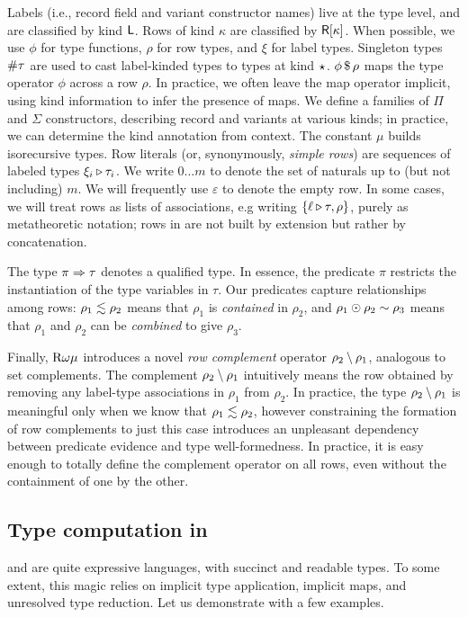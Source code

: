 \documentclass[sigplan,10pt,anonymous,review]{acmart}\settopmatter{printfolios=true,printccs=false,printacmref=false}
\begin{document}
Labels (i.e., record field and variant constructor names) live at the type level, and are classified by kind $\mathsf{L}$. Rows of kind $\kappa$ are classified by $\mathsf{R}[{\kappa}]$. When possible, we use $\phi$ for type functions, $\rho$ for row types, and $\xi$ for label types. Singleton types $\# \tau$ are used to cast label-kinded types to types at kind $\star_{}$.  ${\phi} \, \mathdollar \, \rho$ maps the type operator $\phi$ across a row $\rho$. In practice, we often leave the map operator implicit, using kind information to infer the presence of maps. We define a families of  $\Pi$ and $\Sigma$ constructors, describing record and variants at various kinds; in practice, we can determine the kind annotation from context. The constant $\mu$ builds isorecursive types. Row literals (or, synonymously, \emph{simple rows}) are sequences of labeled types $\xi_i \triangleright \tau_i$. We write $0 \dots m$ to denote the set of naturals up to (but not including) $m$. We will frequently use $\varepsilon$ to denote the empty row. In some cases, we will treat rows as lists of associations, e.g writing $\{\ell \triangleright \tau , \rho\}$, purely as metatheoretic notation; rows in \Rome are not built by extension but rather by concatenation.

The type $\pi \Rightarrow \tau$ denotes a qualified type. In essence, the predicate $\pi$ restricts the instantiation of the type variables in $\tau$. Our predicates capture relationships among rows: $\LeqP {\rho_1} {\rho_2}$ means that $\rho_1$ is \emph{contained} in $\rho_2$, and $\rho_1 \odot \rho_2 \sim \rho_3$ means that $\rho_1$ and $\rho_2$ can be \emph{combined} to give $\rho_3$.

Finally, $\Rome$ introduces a novel \emph{row complement} operator $\rho_2 \setminus \rho_1$, analogous to set complements. The complement $\rho_2 \setminus \rho_1$ intuitively means the row obtained by removing any label-type associations in $\rho_1$ from $\rho_2$. In practice, the type $\rho_2 \setminus \rho_1$ is meaningful only when we know that $\LeqP {\rho_1} {\rho_2}$, however constraining the formation of row complements to just this case introduces an unpleasant dependency between predicate evidence and type well-formedness. In practice, it is easy enough to totally define the complement operator on all rows, even without the containment of one by the other. 

\subsection{Type computation in \Rome}
\RO and \Rome are quite expressive languages, with succinct and readable types. To some extent, this magic relies on implicit type application, implicit maps, and unresolved type reduction. Let us demonstrate with a few examples.
\end{document}
